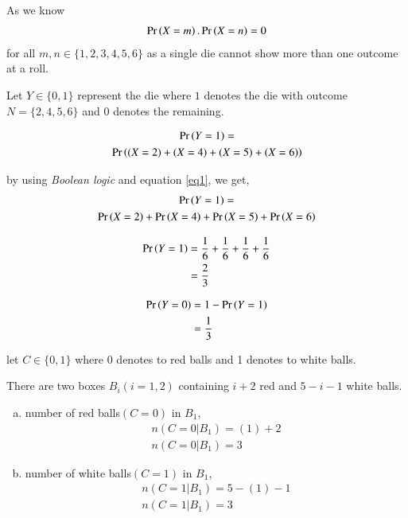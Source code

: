 \documentclass[journal,12pt,twocolumn]{IEEEtran}
\begin{document}
\vspace{0.2in}

As we know
\begin{align}\label{eq1}
    \Pr\left(X=m\right).\Pr\left(X=n\right)=0
\end{align}
for all $m,n \in \{1,2,3,4,5,6\}$ as a single die cannot show more than one outcome at a roll.
\vspace{0.2in}

Let $Y \in \{0, 1\}$ represent the die where $1$ denotes the die with outcome $N = \{2,4,5,6\}$ and $0$ denotes the remaining.

\begin{multline}
    \Pr\left(Y=1\right)=\\
    \Pr\left((X=2)+(X=4)+(X=5)+(X=6)\right)
\end{multline}
\newline

by using \textit{Boolean logic} and equation \eqref{eq1}, we get,
\begin{multline}
    \Pr\left(Y=1\right)=\\
    \Pr\left(X=2\right)+\Pr\left(X=4\right)+\Pr\left(X=5\right)+\Pr\left(X=6\right)
\end{multline}

\begin{align}\label{eq2}
    \begin{split}
        \Pr\left(Y=1\right)&=\frac{1}{6}+\frac{1}{6}+\frac{1}{6}+\frac{1}{6}\\
        &=\frac{2}{3}
    \end{split}
\end{align}

\begin{align}\label{eq3}
    \begin{split}
        \Pr\left(Y=0\right)&=1-\Pr\left(Y=1\right)\\
        &=\frac{1}{3}
    \end{split}
\end{align}
\newline

let $C \in \{0,1\}$ where 0 denotes to red balls and 1 denotes to white balls.
\newline

There are two boxes $B_i(i = 1, 2)$ containing $i + 2$ red and $5−i−1$ white balls.

\begin{enumerate}[(a)]
\item
number of red balls$(C=0)$ in $B_1$,
\begin{align}
    n(C=0|B_1)=(1)+2\\
    n(C=0|B_1)=3
\end{align}
\item
number of white balls$(C=1)$ in $B_1$,
\begin{align}
    n(C=1|B_1)=5-(1)-1\\
    n(C=1|B_1)=3
\end{align}
\end{enumerate}
\end{document}
